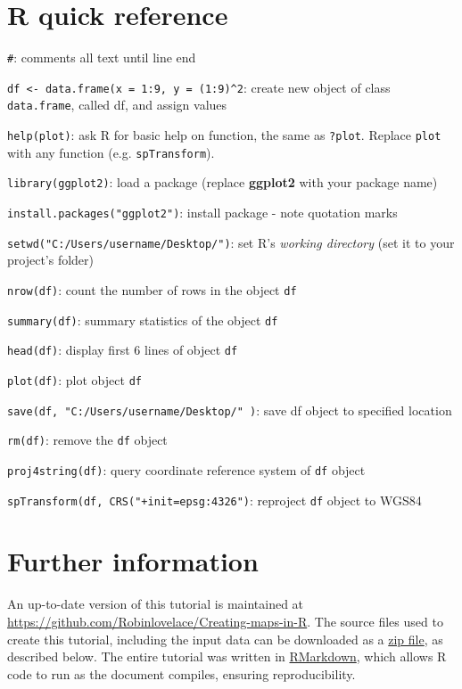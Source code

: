\documentclass[]{article}
\begin{document}
\clearpage

\section{R quick reference}\label{r-quick-reference}

\texttt{\#}: comments all text until line end

\texttt{df \textless{}- data.frame(x = 1:9, y = (1:9)\^{}2}: create new
object of class \texttt{data.frame}, called df, and assign values

\texttt{help(plot)}: ask R for basic help on function, the same as
\texttt{?plot}. Replace \texttt{plot} with any function (e.g.
\texttt{spTransform}).

\texttt{library(ggplot2)}: load a package (replace \textbf{ggplot2} with
your package name)

\texttt{install.packages("ggplot2")}: install package - note quotation
marks

\texttt{setwd("C:/Users/username/Desktop/")}: set R's \emph{working
directory} (set it to your project's folder)

\texttt{nrow(df)}: count the number of rows in the object \texttt{df}

\texttt{summary(df)}: summary statistics of the object \texttt{df}

\texttt{head(df)}: display first 6 lines of object \texttt{df}

\texttt{plot(df)}: plot object \texttt{df}

\texttt{save(df, "C:/Users/username/Desktop/" )}: save df object to
specified location

\texttt{rm(df)}: remove the \texttt{df} object

\texttt{proj4string(df)}: query coordinate reference system of
\texttt{df} object

\texttt{spTransform(df, CRS("+init=epsg:4326")}: reproject \texttt{df}
object to WGS84

\clearpage

\section{Further information}\label{further-information}

An up-to-date version of this tutorial is maintained at
\href{https://github.com/Robinlovelace/Creating-maps-in-R/blob/master/intro-spatial-rl.pdf}{\url{https://github.com/Robinlovelace/Creating-maps-in-R}}.
The source files used to create this tutorial, including the input data
can be downloaded as a
\href{https://github.com/Robinlovelace/Creating-maps-in-R/archive/master.zip}{zip
file}, as described below. The entire tutorial was written in
\href{http://rmarkdown.rstudio.com/}{RMarkdown}, which allows R code to
run as the document compiles, ensuring reproducibility.
\end{document}
